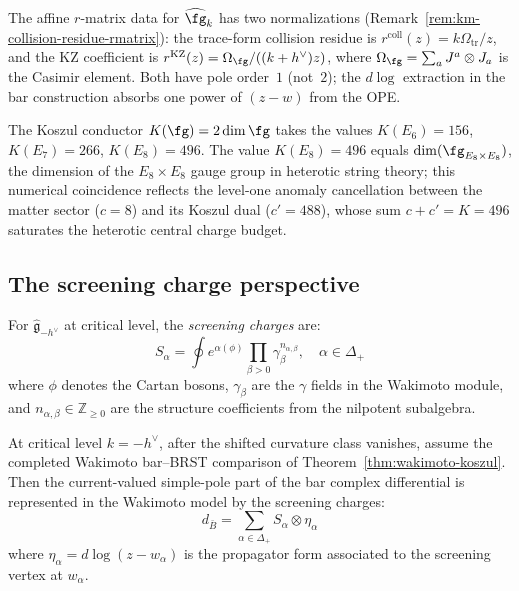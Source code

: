 \begin{remark}%
\label{rem:exceptional-r-matrix}
The affine $r$-matrix data for $\widehat{\fg}_k$ has two
normalizations (Remark~\ref{rem:km-collision-residue-rmatrix}):
the trace-form collision residue is
$r^{\mathrm{coll}}(z)=k\Omega_{\mathrm{tr}}/z$, and the KZ coefficient
is
$r^{\mathrm{KZ}}(z)=\Omega_{\fg}/((k+h^\vee)z)$, where
$\Omega_\fg = \sum_a J^a \otimes J_a$ is the Casimir element. Both
have pole order~$1$ (not~$2$); the $d\log$ extraction in the bar
construction absorbs one power of $(z-w)$ from the OPE.

The Koszul conductor $K(\fg) = 2\dim\fg$ takes the values
$K(E_6) = 156$, $K(E_7) = 266$, $K(E_8) = 496$. The
value $K(E_8) = 496$ equals $\dim(\fg_{E_8 \times E_8})$,
the dimension of the $E_8 \times E_8$ gauge group in
heterotic string theory; this numerical coincidence reflects
the level-one anomaly cancellation between the matter
sector ($c = 8$) and its Koszul dual ($c' = 488$), whose
sum $c + c' = K = 496$ saturates the heterotic central
charge budget.
\end{remark}

\subsection{The screening charge perspective}

\begin{definition}
For $\widehat{\mathfrak{g}}_{-h^\vee}$ at critical level, the \emph{screening charges} are:
\begin{equation}
S_\alpha = \oint e^{\alpha(\phi)} \prod_{\beta > 0} \gamma_\beta^{n_{\alpha,\beta}}, \quad \alpha \in \Delta_+
\end{equation}
where $\phi$ denotes the Cartan bosons, $\gamma_\beta$ are the $\gamma$ fields in the Wakimoto module, and $n_{\alpha,\beta} \in \mathbb{Z}_{\geq 0}$ are the structure coefficients from the nilpotent subalgebra.
\end{definition}

\begin{theorem}\label{thm:screening-bar}
At critical level $k = -h^\vee$, after the shifted curvature class
vanishes, assume the completed Wakimoto bar--BRST comparison of
Theorem~\ref{thm:wakimoto-koszul}.  Then the current-valued simple-pole
part of the bar complex differential is represented in the Wakimoto
model by the screening charges:
\begin{equation}
d_{\bar{B}} = \sum_{\alpha \in \Delta_+} S_\alpha \otimes \eta_\alpha
\end{equation}
where $\eta_\alpha = d\log(z - w_\alpha)$ is the propagator form associated to the screening vertex at $w_\alpha$.
\end{theorem}

